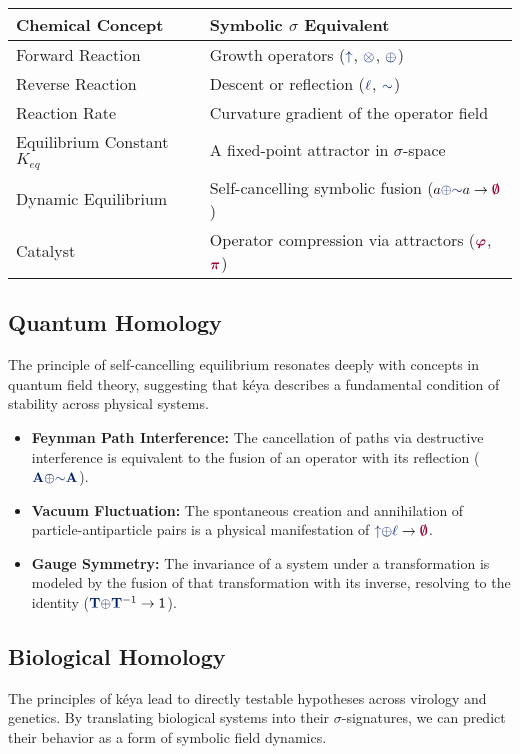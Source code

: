 \begin{center}
\renewcommand{\arraystretch}{1.2}
\begin{tabular}{l l}
\hline
\textbf{Chemical Concept} & \textbf{Symbolic $\sigma$ Equivalent} \\
\hline
Forward Reaction & Growth operators ($\grow$, $\tensor$, $\fuse$) \\
Reverse Reaction & Descent or reflection ($\lha$, $\reflec$) \\
Reaction Rate & Curvature gradient of the operator field \\
Equilibrium Constant $K_{eq}$ & A fixed-point attractor in $\sigma$-space \\
Dynamic Equilibrium & Self-cancelling symbolic fusion ($a \fuse \reflec a \to \void$) \\
Catalyst & Operator compression via attractors ($\gold$, $\pirot$) \\
\hline
\end{tabular}
\end{center}

\subsection{Quantum Homology}
The principle of self-cancelling equilibrium resonates deeply with concepts in quantum field theory, suggesting that kéya describes a fundamental condition of stability across physical systems.
\begin{itemize}
    \item \textbf{Feynman Path Interference:} The cancellation of paths via destructive interference is equivalent to the fusion of an operator with its reflection ($\op{A} \fuse \reflec\op{A}$).
    \item \textbf{Vacuum Fluctuation:} The spontaneous creation and annihilation of particle-antiparticle pairs is a physical manifestation of $\grow \fuse \lha \to \void$.
    \item \textbf{Gauge Symmetry:} The invariance of a system under a transformation is modeled by the fusion of that transformation with its inverse, resolving to the identity ($\op{T} \fuse \op{T}^{-1} \to \sym{1}$).
\end{itemize}

\subsection{Biological Homology}
The principles of kéya lead to directly testable hypotheses across virology and genetics. By translating biological systems into their $\sigma$-signatures, we can predict their behavior as a form of symbolic field dynamics.

